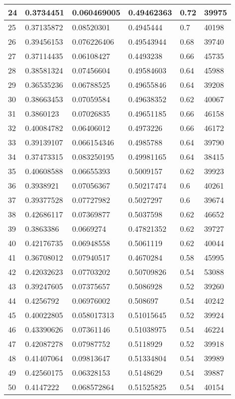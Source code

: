 \begin{longtable}{|l|l|l|l|l|l|}
24 & 0.3734451 & 0.060469005 & 0.49462363 & 0.72 & 39975 \\ \hline 
25 & 0.37135872 & 0.08520301 & 0.4945444 & 0.7 & 40198 \\ \hline 
26 & 0.39456153 & 0.076226406 & 0.49543944 & 0.68 & 39740 \\ \hline 
27 & 0.37114435 & 0.06108427 & 0.4493238 & 0.66 & 45735 \\ \hline 
28 & 0.38581324 & 0.07456604 & 0.49584603 & 0.64 & 45988 \\ \hline 
29 & 0.36535236 & 0.06788525 & 0.49655846 & 0.64 & 39208 \\ \hline 
30 & 0.38663453 & 0.07059584 & 0.49638352 & 0.62 & 40067 \\ \hline 
31 & 0.3860123 & 0.07026835 & 0.49651185 & 0.66 & 46158 \\ \hline 
32 & 0.40084782 & 0.06406012 & 0.4973226 & 0.66 & 46172 \\ \hline 
33 & 0.39139107 & 0.066154346 & 0.4985788 & 0.64 & 39790 \\ \hline 
34 & 0.37473315 & 0.083250195 & 0.49981165 & 0.64 & 38415 \\ \hline 
35 & 0.40608588 & 0.06655393 & 0.5009157 & 0.62 & 39923 \\ \hline 
36 & 0.3938921 & 0.07056367 & 0.50217474 & 0.6 & 40261 \\ \hline 
37 & 0.39377528 & 0.07727982 & 0.5027297 & 0.6 & 39674 \\ \hline 
38 & 0.42686117 & 0.07369877 & 0.5037598 & 0.62 & 46652 \\ \hline 
39 & 0.3863386 & 0.0669274 & 0.47821352 & 0.62 & 39727 \\ \hline 
40 & 0.42176735 & 0.06948558 & 0.5061119 & 0.62 & 40044 \\ \hline 
41 & 0.36708012 & 0.07940517 & 0.4670284 & 0.58 & 45995 \\ \hline 
42 & 0.42032623 & 0.07703202 & 0.50709826 & 0.54 & 53088 \\ \hline 
43 & 0.39247605 & 0.07375657 & 0.5086928 & 0.52 & 39260 \\ \hline 
44 & 0.4256792 & 0.06976002 & 0.508697 & 0.54 & 40242 \\ \hline 
45 & 0.40022805 & 0.058017313 & 0.51015645 & 0.52 & 39924 \\ \hline 
46 & 0.43390626 & 0.07361146 & 0.51038975 & 0.54 & 46224 \\ \hline 
47 & 0.42087278 & 0.07987752 & 0.5118929 & 0.52 & 39918 \\ \hline 
48 & 0.41407064 & 0.09813647 & 0.51334804 & 0.54 & 39989 \\ \hline 
49 & 0.42560175 & 0.06328153 & 0.5148629 & 0.54 & 39887 \\ \hline 
50 & 0.4147222 & 0.068572864 & 0.51525825 & 0.54 & 40154 \\ \hline 
\end{longtable}